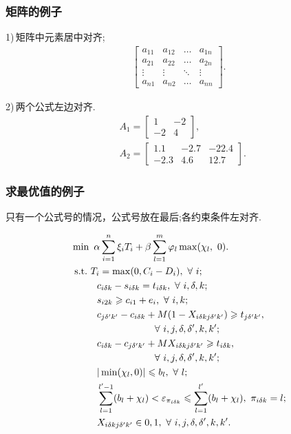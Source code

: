 \documentclass{ctacn}%
\begin{document}
\begin{multicols}{2}
\subsubsection{矩阵的例子}
1)\,矩阵中元素居中对齐;
\begin{align}
\left[\begin{array}{cccc}
a_{11}& a_{12}&\dots &a_{1n}\\
a_{21}& a_{22}&\dots &a_{2n}\\
\vdots&\vdots& \ddots   &\vdots\\
a_{n1}& a_{n2}&\dots &a_{nn}
\end{array}\right].\end{align}

2)\,两个公式左边对齐.
\begin{align}
&A_1=\left[\begin{array}{cc} 1& -2\\-2 &4
\end{array}\right],\\
&A_2=\left[\begin{array}{ccc} 1.1 &-2.7&-22.4\\-2.3 &4.6 &12.7
\end{array}\right].
\end{align}


\subsubsection{求最优值的例子}
只有一个公式号的情况，公式号放在最后;各约束条件左对齐.
\begin{center}

\begin{align}
&\min~\alpha\sum\limits_{i=1}^n\xi_{i}T_{i}+\beta \sum\limits_{l=1}^m \varphi_{l} \max(\chi_{l},~0).\notag\\
&{\rm{~s.t.~}}T_{i}=\max(0,C_i-D_i),~\forall~i;\notag\\
&~~~~~~~~c_{i \delta k}-s_{i \delta k}=t_{i \delta k},~\forall~i,\delta,k;\notag\\
&~~~~~~~~s_{i 2 k}\geqslant c_{i 1 }+e_i,~\forall~i,k;\notag\\
&~~~~~~~~c_{j \delta' k'}-c_{i \delta k}+M(1-X_{i \delta k j\delta'k'})\geqslant t_{j \delta' k'},\notag\\
&~~~~~~~~~~~~~~~~~~~~~~~~~~\forall~i,j,\delta,\delta',k,k';\notag\\
&~~~~~~~~c_{i \delta k}-c_{j \delta' k'}+M X_{i \delta k j\delta'k'}\geqslant t_{i \delta k},\notag\\
&~~~~~~~~~~~~~~~~~~~~~~~~~~\forall~i,j,\delta,\delta',k,k';\notag\\
&~~~~~~~~|\min(\chi_{l},0)|\leqslant b_l,~\forall~ l;\notag\\
&~~~~~~~~\sum\limits_{l=1}^{l'-1} (b_{l}+\chi_{l})< \varepsilon_{\pi_{i \delta k}}\leqslant  \sum\limits_{l=1}^{l'} (b_{l}+\chi_{l}),~\pi_{i \delta k}=l;\notag\\
&~~~~~~~~X_{i \delta k j\delta'k'} \in {0,1},~\forall~ i,j,\delta,\delta',k,k'.
\end{align}
\end{center}



\end{multicols}
\end{document}
